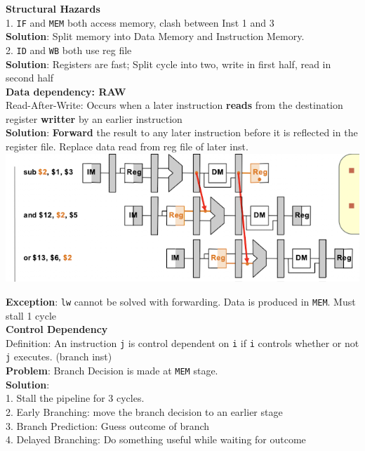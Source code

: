 \documentclass[10pt, a4paper]{article}
\newcommand{\highlight}[1]{{\color{red}\textbf{#1}}}
\begin{document}
\begin{multicols*}{3}
		\textbf{Structural Hazards}\\
		1. \texttt{IF} and \texttt{MEM} both access memory, clash between Inst 1 and 3\\
		\highlight{Solution}: Split memory into Data Memory and Instruction Memory.\\
		
		2. \texttt{ID} and \texttt{WB} both use reg file\\
		\highlight{Solution}: Registers are fast; Split cycle into two, write in first half, read in second half\\
		
		\textbf{Data dependency: RAW}\\
		Read-After-Write: Occurs when a later instruction \highlight{reads} from the destination register \highlight{writter} by an earlier instruction\\
		\highlight{Solution}: \highlight{Forward} the result to any later instruction before it is reflected in the register file. Replace data read from reg file of later inst.\\
		\includegraphics[scale=.7]{./assets/dataForwarding}
		
		\highlight{Exception}: \texttt{lw} cannot be solved with forwarding. Data is produced in \texttt{MEM}. Must stall 1 cycle\\
		
		\textbf{Control Dependency}\\
		Definition: An instruction \texttt{j} is control dependent on \texttt{i} if \texttt{i} controls whether or not \texttt{j} executes. (branch inst)\\
		
		\highlight{Problem}: Branch Decision is made at \texttt{MEM} stage.\\
		\highlight{Solution}: \\
		1. Stall the pipeline for 3 cycles.\\
		2. Early Branching: move the branch decision to an earlier stage\\
		3. Branch Prediction: Guess outcome of branch\\
		4. Delayed Branching: Do something useful while waiting for outcome\\
		

\end{multicols*}
\end{document}
